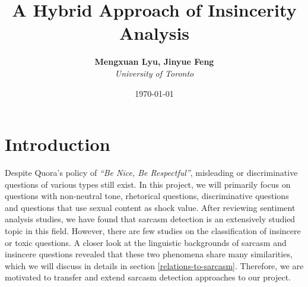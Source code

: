 \documentclass[12pt]{diazessay} %
\title{\textbf{A Hybrid Approach of Insincerity Analysis}} %
\author{\textbf{Mengxuan Lyu, Jinyue Feng} \\ \textit{University of Toronto}} %
\date{\today} %
\begin{document}
\maketitle %






\doublespacing %

\section{Introduction}

Despite Quora's policy of \textit{``Be Nice, Be Respectful''}, misleading or discriminative questions of various types still exist. In this project, we will primarily focus on questions with non-neutral tone, rhetorical questions, discriminative questions and questions that use sexual content as shock value. After reviewing sentiment analysis studies, we have found that sarcasm detection is an extensively studied topic in this field. However, there are few studies on the classification of insincere or toxic questions. A closer look at the linguistic backgrounds of sarcasm and insincere questions revealed that these two phenomena share many similarities, which we will discuss in details in section \ref{relations-to-sarcasm}. Therefore, we are motivated to transfer and extend sarcasm detection approaches to our project. 
\end{document}
